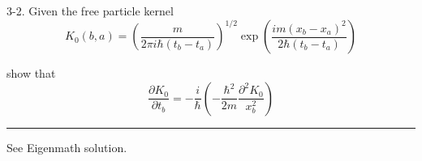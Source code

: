 \documentclass[12pt]{article}
\begin{document}
3-2.
Given the free particle kernel
\begin{equation*}
K_0(b,a)=\left(\frac{m}{2\pi i\hbar(t_b-t_a)}\right)^{1/2}
\exp\left(\frac{im(x_b-x_a)^2}{2\hbar(t_b-t_a)}\right)
\end{equation*}

show that
\begin{equation*}
\frac{\partial K_0}{\partial t_b}
=-\frac{i}{\hbar}
\left(
-\frac{\hbar^2}{2m}
\frac{\partial^2 K_0}{x_b^2}
\right)
\end{equation*}

\bigskip
\hrule

\bigskip
See Eigenmath solution.
\end{document}
